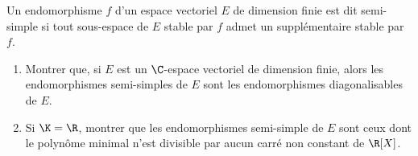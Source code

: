 \begin{enonce}
\begin{exercise}[ID={RMS133 E1001},subtitle={Centrale MP 2022},tags={},difficulty={}]
Un endomorphisme $f$ d'un espace vectoriel $E$ de dimension finie est dit semi-simple si tout sous-espace de $E$ stable par $f$ admet un supplémentaire stable par $f$.
\begin{enumerate}
  \item Montrer que, si $E$ est un $\C$-espace vectoriel de dimension finie, alors les endomorphismes semi-simples de $E$ sont les endomorphismes diagonalisables de $E$.

  \item Si $\K=\R$, montrer que les endomorphismes semi-simple de $E$ sont ceux dont le polynôme minimal n'est divisible par aucun carré non constant de $\R[X]$.
\end{enumerate}
\end{exercise}
\begin{solution}
\end{solution}
\end{enonce}
